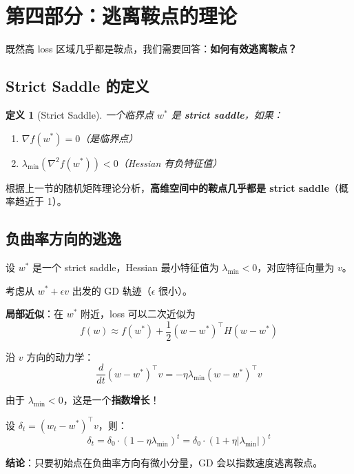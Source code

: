 \documentclass[12pt, a4paper]{ctexart}
\newtheorem{definition}[theorem]{定义}
\begin{document}
\section{第四部分：逃离鞍点的理论}

既然高 loss 区域几乎都是鞍点，我们需要回答：\textbf{如何有效逃离鞍点？}

\subsection{Strict Saddle 的定义}

\begin{definition}[Strict Saddle]
一个临界点 $w^*$ 是 \textbf{strict saddle}，如果：
\begin{enumerate}
    \item $\nabla f(w^*) = 0$（是临界点）
    \item $\lambda_{\min}(\nabla^2 f(w^*)) < 0$（Hessian 有负特征值）
\end{enumerate}
\end{definition}

根据上一节的随机矩阵理论分析，\textbf{高维空间中的鞍点几乎都是 strict saddle}（概率趋近于 1）。

\subsection{负曲率方向的逃逸}

\begin{blackboard}

设 $w^*$ 是一个 strict saddle，Hessian 最小特征值为 $\lambda_{\min} < 0$，对应特征向量为 $v$。

考虑从 $w^* + \epsilon v$ 出发的 GD 轨迹（$\epsilon$ 很小）。

\textbf{局部近似}：在 $w^*$ 附近，loss 可以二次近似为
\[
f(w) \approx f(w^*) + \frac{1}{2}(w - w^*)^\top H (w - w^*)
\]

沿 $v$ 方向的动力学：
\[
\frac{d}{dt}(w - w^*)^\top v = -\eta \lambda_{\min} (w - w^*)^\top v
\]

由于 $\lambda_{\min} < 0$，这是一个\textbf{指数增长}！

设 $\delta_t = (w_t - w^*)^\top v$，则：
\[
\delta_t = \delta_0 \cdot (1 - \eta \lambda_{\min})^t = \delta_0 \cdot (1 + \eta |\lambda_{\min}|)^t
\]

\textbf{结论}：只要初始点在负曲率方向有微小分量，GD 会以指数速度逃离鞍点。

\end{blackboard}
\end{document}
